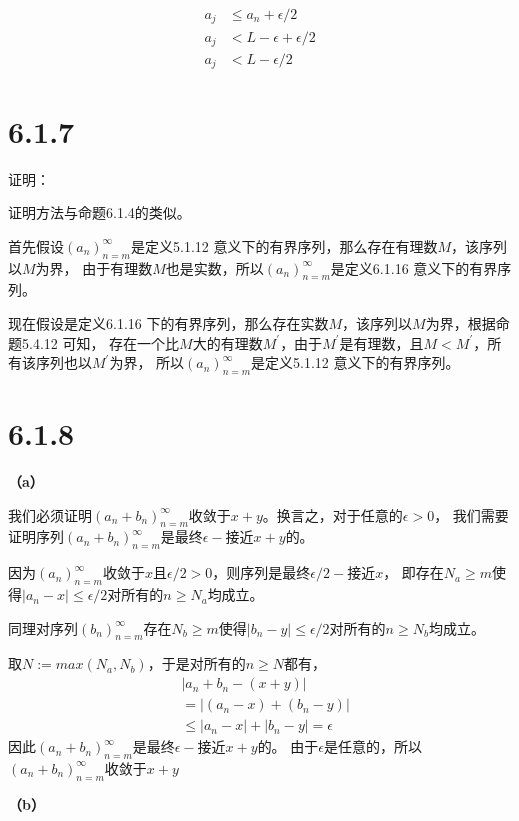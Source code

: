\documentclass{article}
\theoremstyle{mystyle}
\begin{document}
\begin{align*}
  a_j & \leq a_n + \epsilon/2       \\
  a_j & < L - \epsilon + \epsilon/2 \\
  a_j & < L - \epsilon/2
\end{align*}

\section*{6.1.7}

证明：

证明方法与命题6.1.4的类似。

首先假设$(a_n)_{n=m}^\infty$是定义5.1.12 意义下的有界序列，那么存在有理数$M$，该序列以$M$为界，
由于有理数$M$也是实数，所以$(a_n)_{n=m}^\infty$是定义6.1.16 意义下的有界序列。

现在假设是定义6.1.16 下的有界序列，那么存在实数$M$，该序列以$M$为界，根据命题5.4.12 可知，
存在一个比$M$大的有理数$M^\prime$，由于$M^\prime$是有理数，且$M < M^\prime$，所有该序列也以$M^\prime$为界，
所以$(a_n)_{n=m}^\infty$是定义5.1.12 意义下的有界序列。

\section*{6.1.8}

\textbf{（a）}

我们必须证明$(a_n+b_n)_{n=m}^\infty$收敛于$x+y$。换言之，对于任意的$\epsilon > 0$，
我们需要证明序列$(a_n+b_n)_{n=m}^\infty$是最终$\epsilon -$接近$x+y$的。

因为$(a_n)_{n=m}^\infty$收敛于$x$且$\epsilon /2 > 0$，则序列是最终$\epsilon /2 -$接近$x$，
即存在$N_a \geq m$使得$|a_n - x| \leq \epsilon /2$对所有的$n \geq N_a$均成立。

同理对序列$(b_n)_{n=m}^\infty$存在$N_b \geq m$使得$|b_n - y| \leq \epsilon /2$对所有的$n \geq N_b$均成立。

取$N := max(N_a, N_b)$，于是对所有的$n \geq N$都有，
\begin{align*}
   & |a_n + b_n - (x+y)|                   \\
   & =|(a_n - x) + (b_n - y)|              \\
   & \leq |a_n - x| + |b_n - y| = \epsilon
\end{align*}
因此$(a_n+b_n)_{n=m}^\infty$是最终$\epsilon -$接近$x+y$的。
由于$\epsilon$是任意的，所以$(a_n+b_n)_{n=m}^\infty$收敛于$x+y$

\textbf{（b）}
\end{document}
